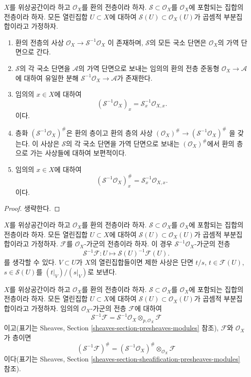 \begin{lemma}
\label{lemma-simple-invert}
$X$를 위상공간이라 하고 $\mathcal{O}_X$를 환의 전층이라 하자.
$\mathcal{S} \subset \mathcal{O}_X$를 $\mathcal{O}_X$에 포함되는
집합의 전층이라 하자. 모든 열린집합 $U \subset X$에 대하여
$\mathcal{S}(U) \subset \mathcal{O}_X(U)$가 곱셈적 부분집합이라고
가정하자.
\begin{enumerate}
\item 환의 전층의 사상
$\mathcal{O}_X \to \mathcal{S}^{-1}\mathcal{O}_X$
이 존재하며, $\mathcal{S}$의 모든 국소 단면은 $\mathcal{O}_X$의
가역 단면으로 간다.
\item $\mathcal{S}$의 각 국소 단면을 $\mathcal{A}$의 가역 단면으로
보내는 임의의 환의 전층 준동형 $\mathcal{O}_X \to \mathcal{A}$에 대하여
유일한 분해
$\mathcal{S}^{-1}\mathcal{O}_X \to \mathcal{A}$가 존재한다.
\item 임의의 $x \in X$에 대하여
$$
(\mathcal{S}^{-1}\mathcal{O}_X)_x = \mathcal{S}_x^{-1} \mathcal{O}_{X, x}.
$$
이다.
\item 층화 $(\mathcal{S}^{-1}\mathcal{O}_X)^\#$은 환의 층이고
환의 층의 사상
$(\mathcal{O}_X)^\# \to (\mathcal{S}^{-1}\mathcal{O}_X)^\#$
을 갖는다. 이 사상은 $\mathcal{S}$의 각 국소 단면을 가역 단면으로
보내는 $(\mathcal{O}_X)^\#$에서 환의 층으로 가는 사상들에 대하여
보편적이다.
\item 임의의 $x \in X$에 대하여
$$
(\mathcal{S}^{-1}\mathcal{O}_X)^\#_x = \mathcal{S}_x^{-1} \mathcal{O}_{X, x}.
$$
이다.
\end{enumerate}
\end{lemma}

\begin{proof}
생략한다.
\end{proof}

\noindent
$X$를 위상공간이라 하고 $\mathcal{O}_X$를 환의 전층이라 하자.
$\mathcal{S} \subset \mathcal{O}_X$를 $\mathcal{O}_X$에 포함되는
집합의 전층이라 하자. 모든 열린집합 $U \subset X$에 대하여
$\mathcal{S}(U) \subset \mathcal{O}_X(U)$가 곱셈적 부분집합이라고
가정하자. $\mathcal{F}$를 $\mathcal{O}_X$-가군의 전층이라 하자.
이 경우 $\mathcal{S}^{-1}\mathcal{O}_X$-가군의 전층
$$
\mathcal{S}^{-1}\mathcal{F} :
U \longmapsto \mathcal{S}(U)^{-1}\mathcal{F}(U).
$$
를 생각할 수 있다. $V \subset U$가 $X$의 열린집합들이면 제한 사상은
단면 $t/s$, $t \in \mathcal{F}(U)$, $s \in \mathcal{S}(U)$를
$(t|_V)/(s|_V)$로 보낸다.

\begin{lemma}
\label{lemma-simple-invert-module}
$X$를 위상공간이라 하고 $\mathcal{O}_X$를 환의 전층이라 하자.
$\mathcal{S} \subset \mathcal{O}_X$를 $\mathcal{O}_X$에 포함되는
집합의 전층이라 하자. 모든 열린집합 $U \subset X$에 대하여
$\mathcal{S}(U) \subset \mathcal{O}_X(U)$가 곱셈적 부분집합이라고
가정하자. 임의의 $\mathcal{O}_X$-가군의 전층 $\mathcal{F}$에 대하여
$$
\mathcal{S}^{-1}\mathcal{F}
=
\mathcal{S}^{-1}\mathcal{O}_X \otimes_{p, \mathcal{O}_X} \mathcal{F}
$$
이고(표기는 Sheaves, Section \ref{sheaves-section-presheaves-modules} 참조),
$\mathcal{F}$와 $\mathcal{O}_X$가 층이면
$$
(\mathcal{S}^{-1}\mathcal{F})^\#
=
(\mathcal{S}^{-1}\mathcal{O}_X)^\# \otimes_{\mathcal{O}_X} \mathcal{F}
$$
이다(표기는 Sheaves, Section
\ref{sheaves-section-sheafification-presheaves-modules} 참조).
\end{lemma}

